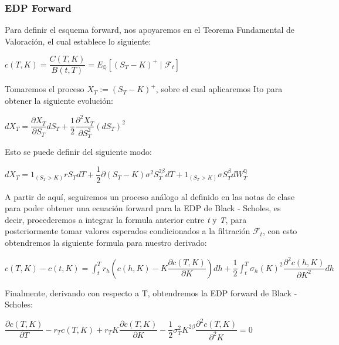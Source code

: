 \documentclass[titlepage]{article}
\begin{document}
\newpage
\subsubsection*{EDP Forward}

Para definir el esquema forward, nos apoyaremos en el Teorema Fundamental de Valoración, el cual establece lo siguiente:

\begin{center}
	$c(T,K) = \dfrac{C(T,K)}{B(t,T)} = E_{\mathbb{Q}}[(S_{T} - K)^{+} \mid \mathcal{F}_{t}]$
\end{center}

Tomaremos el proceso $X_{T} := (S_{T} - K)^{+}$, sobre el cual aplicaremos Ito para obtener la siguiente evolución:

\begin{center}
	$dX_{T} = \dfrac{\partial X_{T}}{\partial S_{T}} dS_{T} + \dfrac{1}{2} \dfrac{\partial^{2} X_{T}}{\partial S_{T}^{2}}(dS_{T})^{2}$
\end{center}

Esto se puede definir del siguiente modo:

\begin{center}
	$dX_{T} = 1_{(S_{T} > K)} r S_{T} dT + \dfrac{1}{2} \partial (S_{T} - K) \sigma^{2}S_{T}^{2\beta}dT + 1_{(S_{T} > K)} \sigma S_{T}^{\beta} dW_{T}^{\mathbb{Q}}$
\end{center}

A partir de aquí, seguiremos un proceso análogo al definido en las notas de clase para poder obtener una ecuación forward para la EDP de Black - Scholes, es decir, procederemos a integrar la formula anterior entre \textit{t} y \textit{T}, para posteriormente tomar valores esperados condicionados a la filtración $\mathcal{F}_{t}$, con esto obtendremos la siguiente formula para nuestro derivado:

\begin{center}
	$c(T,K) - c(t, K) = \displaystyle \int_{t}^{T} r_{h} (c(h, K) - K \dfrac{\partial c(T,K)}{\partial K}) dh + \dfrac{1}{2} \int_{t}^{T} \sigma_{h}(K)^{2} \dfrac{\partial^{2}c(h, K)}{\partial K^{2}} dh$
\end{center}

Finalmente, derivando con respecto a T, obtendremos la EDP forward de Black - Scholes:

\begin{center}
	$\dfrac{\partial c(T, K)}{\partial T} - r_{T} c(T, K) + r_{T}K \dfrac{\partial c(T, K)}{\partial K} - \dfrac{1}{2} \sigma_{T}^{2}K^{2 \beta} \dfrac{\partial^{2}c(T, K)}{\partial^{2}K} = 0$
\end{center}
\end{document}
